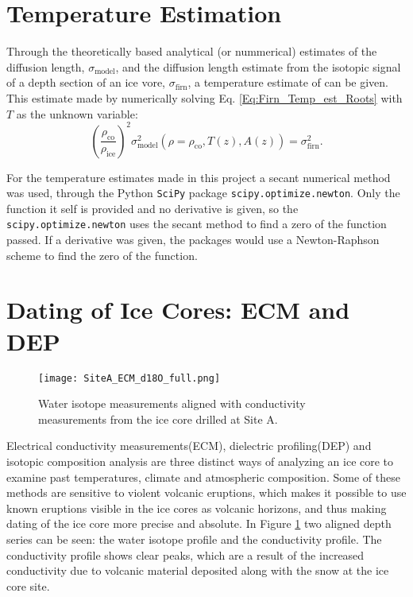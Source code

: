 \documentclass[../../CompleteThesis2/Complete_2ndDraft]{subfiles}
\begin{document}
\section[Temperature Estimation]{Temperature Estimation}
\label{Sec:Ice_TempEstimation}

Through the theoretically based analytical (or nummerical) estimates of the diffusion length, $\sigma_{\text{model}}$, and the diffusion length estimate from the isotopic signal of a depth section of an ice vore, $\sigma_{\text{firn}}$, a temperature estimate of can be given. This estimate made by numerically solving Eq. \ref{Eq:Firn_Temp_est_Roots} with $T$ as the unknown variable:
\begin{equation}
	\left(\frac{\rho_{\text{co}}}{\rho_{\text{ice}}}\right)^2 \sigma_{\text{model}}^2(\rho=\rho_{\text{co}}, T(z), A(z)) = \sigma^2_{\text{firn}}.
	\label{Eq:Firn_Temp_est_Roots2}
\end{equation}

For the temperature estimates made in this project a secant numerical method\cite{Press2007} was used, through the Python \lstinline[language=Python]|SciPy| package \lstinline[language=Python]|scipy.optimize.newton|. Only the function it self is provided and no derivative is given, so the \lstinline[language=Python]|scipy.optimize.newton| uses the secant method to find a zero of the function passed. If a derivative was given, the packages would use a Newton-Raphson\cite{Press2007} scheme to find the zero of the function.






\section[ECM and DEP][ECM and DEP]{Dating of Ice Cores: ECM and DEP}
\label{Sec:Ice_ECMandDEP}

\begin{figure}[h]
	\centering
	\texttt{[image: SiteA\_ECM\_d18O\_full.png]}
	\caption{Water isotope measurements aligned with conductivity measurements from the ice core drilled at Site A.}
	\label{Fig:ICE_SiteA_ECM_d18O_full}
\end{figure}

Electrical conductivity measurements(ECM), dielectric profiling(DEP) and isotopic composition analysis are three distinct ways of analyzing an ice core to examine past temperatures, climate and atmospheric composition. Some of these methods are sensitive to violent volcanic eruptions, which makes it possible to use known eruptions visible in the ice cores as volcanic horizons, and thus making dating of the ice core more precise and absolute. In Figure \ref{Fig:ICE_SiteA_ECM_d18O_full} two aligned depth series can be seen: the water isotope profile and the conductivity profile. The conductivity profile shows clear peaks, which are a result of the increased conductivity due to volcanic material deposited along with the snow at the ice core site.
\end{document}
